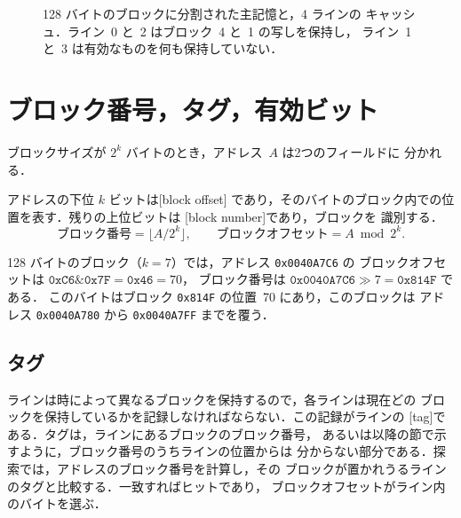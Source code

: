 \documentclass[../main.tex]{subfiles}
\begin{document}
\begin{figure}[htbp]
  \centering
  
  \caption{128 バイトのブロックに分割された主記憶と，4 ラインの
    キャッシュ．ライン~0 と~2 はブロック~4 と~1 の写しを保持し，
    ライン~1 と~3 は有効なものを何も保持していない．}
  \label{fig:l12-blocks}
\end{figure}

\section{ブロック番号，タグ，有効ビット}
\label{sec:l12-tags}

ブロックサイズが $2^{k}$ バイトのとき，アドレス~$A$ は2つのフィールドに
分かれる．

\begin{definition}[ブロックオフセットとブロック番号]
  アドレスの下位 $k$ ビットは[block offset]%
  であり，そのバイトのブロック内での位置を表す．残りの上位ビットは
  [block number]であり，ブロックを
  識別する．
  \begin{equation}
    \text{ブロック番号} = \bigl\lfloor A / 2^{k} \bigr\rfloor ,
    \qquad
    \text{ブロックオフセット} = A \bmod 2^{k} .
    \label{eq:l12-block-number}
  \end{equation}
\end{definition}

\begin{example}
  \label{ex:l12-block-number}
  128 バイトのブロック（$k=7$）では，アドレス \texttt{0x0040A7C6} の
  ブロックオフセットは
  $\texttt{0xC6} \mathbin{\&} \texttt{0x7F} = \texttt{0x46} = 70$，
  ブロック番号は $\texttt{0x0040A7C6} \gg 7 = \texttt{0x814F}$ である．
  このバイトはブロック \texttt{0x814F} の位置~70 にあり，このブロックは
  アドレス \texttt{0x0040A780} から \texttt{0x0040A7FF} までを覆う．
\end{example}

\subsection{タグ}

ラインは時によって異なるブロックを保持するので，各ラインは現在どの
ブロックを保持しているかを記録しなければならない．この記録がラインの
[tag]である．タグは，ラインにあるブロックのブロック番号，
あるいは以降の節で示すように，ブロック番号のうちラインの位置からは
分からない部分である．探索では，アドレスのブロック番号を計算し，その
ブロックが置かれうるラインのタグと比較する．一致すればヒットであり，
ブロックオフセットがライン内のバイトを選ぶ．
\end{document}
